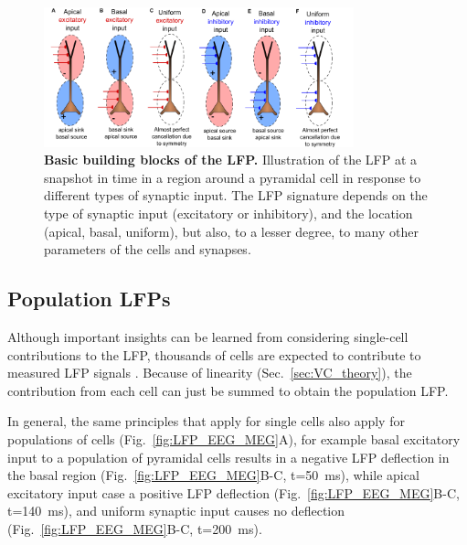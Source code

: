 \documentclass[preprint,11pt,authoryear]{elsarticle}
\begin{document}
\begin{figure}[h!]
\begin{center}
\includegraphics[width=0.8\textwidth]{dipole_basics}
\end{center}
\caption{\textbf{Basic building blocks of the LFP.} Illustration of the LFP at a snapshot in time in a region around a pyramidal cell in response to different types of synaptic input.  
The LFP signature depends on the type of synaptic input (excitatory or inhibitory), and the location (apical, basal, uniform), but also, to a lesser degree, to many other parameters of the cells and synapses.
}
\label{fig:dipole_basics}
\end{figure}

\subsection*{Population LFPs}
Although important insights can be learned from considering single-cell contributions to the LFP, thousands of cells are expected to contribute to measured LFP signals \citep{Linden2011, Pesaran2018}. Because of linearity (Sec.~\ref{sec:VC_theory}), the contribution from each cell can just be summed to obtain the population LFP.

In general, the same principles that apply for single cells also apply for populations of cells (Fig.~\ref{fig:LFP_EEG_MEG}A), for example basal excitatory input to a population of pyramidal cells results in a negative LFP deflection in the basal region (Fig.~\ref{fig:LFP_EEG_MEG}B-C, t=50~ms), while apical excitatory input case a positive LFP deflection (Fig.~\ref{fig:LFP_EEG_MEG}B-C, t=140~ms), and uniform synaptic input causes no deflection (Fig.~\ref{fig:LFP_EEG_MEG}B-C, t=200~ms).
\end{document}
